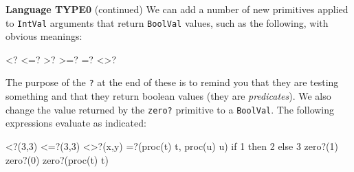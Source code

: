 \begin{minipage}[t]{\sw}
\slidenumber
\LARGE
{\bf Language TYPE0} (continued)\exx
\Large
We can add a number of new primitives applied
to \verb'IntVal' arguments
that return \verb'BoolVal' values,
such as the following, with obvious meanings:
\large
\begin{qv}
<?
<=?
>?
>=?
=?
<>?
\end{qv}
\Large
The purpose of the \verb'?' at the end of these
is to remind you that they are testing something
and that they return boolean values
(they are {\em predicates}).
We also change the value returned by the \verb'zero?' primitive
to a \verb'BoolVal'.\exx
The following expressions evaluate as indicated:
\large
\begin{qv}
<?(3,3)                  %
<=?(3,3)                 %
<>?(x,y)                 %
=?(proc(t) t, proc(u) u) %
if 1 then 2 else 3       %
zero?(1)                 %
zero?(0)                 %
zero?(proc(t) t)         %
\end{qv}
\Large
\end{minipage}
